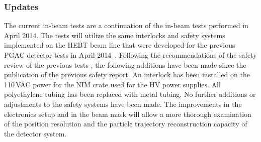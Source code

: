 \subsubsection{Updates}
The current in-beam tests are a continuation of the in-beam tests performed in April 2014.
The tests will utilize the same interlocks and safety systems implemented on the HEBT beam line that were developed for the previous PGAC detector tests in April 2014~\cite{old_safety}. Following the recommendations of the safety review of the previous tests \cite{old_review}, the following additions have been made since the publication of the previous safety report. An interlock has been installed on the 110\,VAC power for the NIM crate used for the HV power supplies. All polyethylene tubing has been replaced with metal tubing. 
No further additions or adjustments to the safety systems have been made.
The improvements in the electronics setup and in the beam mask will %
 allow a more thorough examination of the position resolution and the particle trajectory reconstruction capacity of the detector system. %


